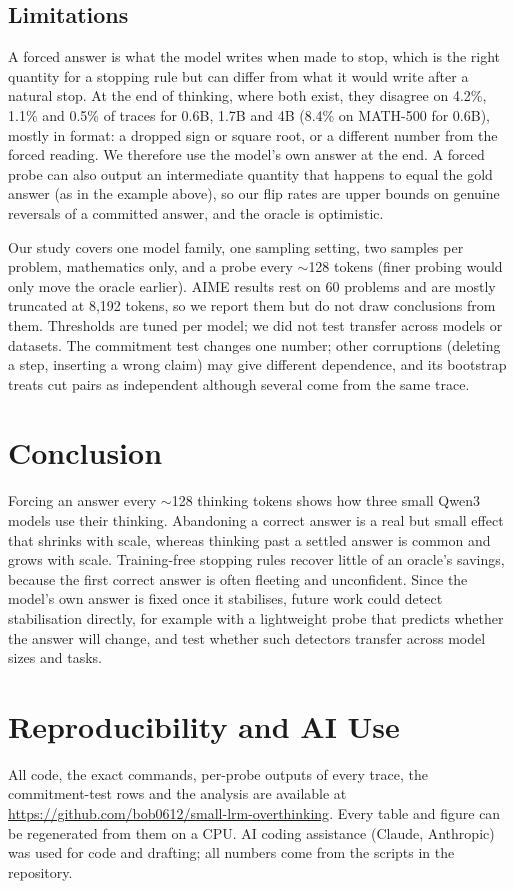 \documentclass[conference]{IEEEtran}
\newcommand{\repo}{\url{https://github.com/bob0612/small-lrm-overthinking}}
\begin{document}
\subsection{Limitations}
A forced answer is what the model writes when made to stop,
which is the right quantity for a stopping rule but can differ from what it would write after a natural stop. At the
end of thinking, where both exist, they disagree on 4.2\%, 1.1\% and 0.5\% of traces for 0.6B, 1.7B and 4B (8.4\% on MATH-500 for 0.6B), mostly in format: a dropped sign or square root, or a different number from the forced reading. We
therefore use the model's own answer at the end. A forced probe can also output an intermediate quantity that happens to
equal the gold answer (as in the example above), so our flip rates are upper bounds on genuine reversals of a
committed answer, and the oracle is optimistic.

Our study covers one model family, one sampling setting, two samples per problem, mathematics only, and a probe every
$\sim$128 tokens (finer probing would only move the oracle earlier). AIME results rest on 60 problems and are mostly
truncated at 8{,}192 tokens, so we report them but do not draw conclusions from them. Thresholds are tuned per model;
we did not test transfer across models or datasets. The commitment test changes one number; other corruptions
(deleting a step, inserting a wrong claim) may give different dependence, and its bootstrap treats cut pairs as
independent although several come from the same trace.

\section{Conclusion}
Forcing an answer every $\sim$128 thinking tokens shows how three small Qwen3 models use their thinking. Abandoning a
correct answer is a real but small effect that shrinks with scale, whereas thinking past a settled answer is common and
grows with scale. Training-free stopping rules recover little of an oracle's savings, because the first correct
answer is often fleeting and unconfident. Since the model's own answer is fixed once it stabilises, future work could
detect stabilisation directly, for example with a lightweight probe that predicts whether the answer will change, and
test whether such detectors transfer across model sizes and tasks.

\section*{Reproducibility and AI Use}
All code, the exact commands, per-probe outputs of every trace, the commitment-test rows and the analysis are
available at \repo. Every table and figure can be regenerated from them on a CPU. AI coding assistance (Claude, Anthropic)
was used for code and drafting; all numbers come from the scripts in the repository.



\end{document}
